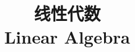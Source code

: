 \documentclass{../thunote}
\begin{document}
\title{线性代数\\Linear Algebra}
\maketitle

\frontmatter
\tableofcontents

\mainmatter










\end{document}

